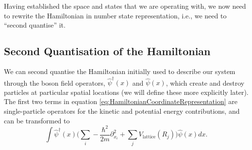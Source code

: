 \documentclass[a4paper,10pt]{article}
\begin{document}
Having established the space and states that we are operating with, we now need to rewrite the Hamiltonian in number state representation, i.e., we need to
``second quantise'' it. 

\subsection{Second Quantisation of the Hamiltonian}
We can second quantise the Hamiltonian initially used to describe our system through the boson field operators, $\hat{\psi}^{\dagger}(x)$ and $\hat{\psi}(x)$, which create and destroy 
particles at particular spatial locations (we will define these more explicitly later). The first two terms in equation \eqref{eq:HamiltonianCoordinateRepresentation} are single-particle
operators for the kinetic and potential energy contributions, and can be transformed to
\begin{equation}
 \int  \hat{\psi}^{\dagger}(x) \bigg(  \sum_{i}-\frac{\hbar^{2}}{2m}  \partial_{x_{i}}^2+\sum_{j}V_{\text{lattice}}(R_{j})  \bigg)    \hat{\psi}(x)dx.
\end{equation}
\end{document}
